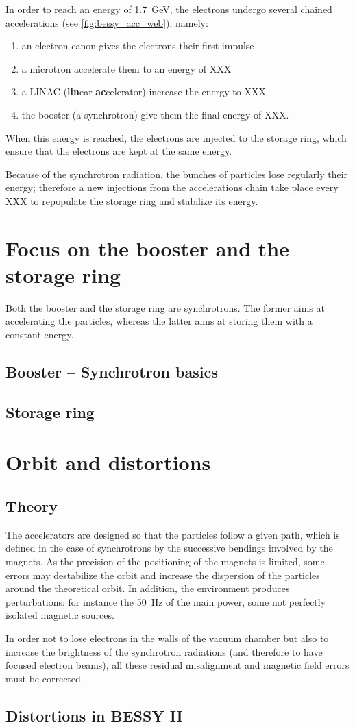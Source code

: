 In order to reach an energy of 1.7~GeV, the electrons undergo several chained accelerations (see \autoref{fig:bessy_acc_web}), namely:
\begin{enumerate}
    \item an electron canon gives the electrons their first impulse
    \item a microtron accelerate them to an energy of XXX
    \item a LINAC (\textbf{lin}ear \textbf{ac}celerator) increase the energy to XXX
    \item the booster (a synchrotron) give them the final energy of XXX.
\end{enumerate}

When this energy is reached, the electrons are injected to the storage ring, which ensure that the electrons are kept at the same energy.

Because of the synchrotron radiation, the bunches of particles lose regularly their energy; therefore a new injections from the accelerations chain take place every XXX to repopulate the storage ring and stabilize its energy.

\section{Focus on the booster and the storage ring}
Both the booster and the storage ring are synchrotrons. The former aims at accelerating the particles, whereas the latter aims at storing them with a constant energy.

\subsection{Booster -- Synchrotron basics}

\subsection{Storage ring}

\section{Orbit and distortions}
\subsection{Theory}
The accelerators are designed so that the particles follow a given path, which is defined in the case of synchrotrons by the successive bendings involved by the magnets. As the precision of the positioning of the magnets is limited, some errors may destabilize the orbit and increase the dispersion of the particles around the theoretical orbit. In addition, the environment produces perturbations: for instance the 50~Hz of the main power, some not perfectly isolated magnetic sources.

In order not to lose electrons in the walls of the vacuum chamber but also to increase the brightness of the synchrotron radiations (and therefore to have focused electron beams), all these residual misalignment and magnetic field errors must be corrected.

\subsection{Distortions in BESSY II}


